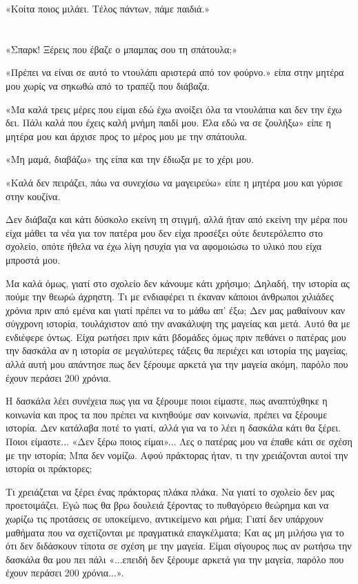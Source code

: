 \documentclass[12pt,twoside, openany]{book}
\begin{document}
«Κοίτα ποιος μιλάει. Τέλος πάντων, πάμε παιδιά.»

\chapter{}

«Σπαρκ! Ξέρεις που έβαζε ο μπαμπας σου τη σπάτουλα;»

«Πρέπει να είναι σε αυτό το ντουλάπι αριστερά από τον φούρνο.» είπα στην μητέρα μου χωρίς να σηκωθώ από το τραπέζι που διάβαζα.

«Μα καλά τρεις μέρες που είμαι εδώ έχω ανοίξει όλα τα ντουλάπια και δεν την έχω δει. Πάλι καλά που έχεις καλή μνήμη παιδί μου. Έλα εδώ να σε ζουλήξω» είπε η μητέρα μου και άρχισε προς το μέρος μου με την σπάτουλα.

«Μη μαμά, διαβάζω» της είπα και την έδιωξα με το χέρι μου.

«Καλά δεν πειράζει, πάω να συνεχίσω να μαγειρεύω» είπε η μητέρα μου και γύρισε στην κουζίνα.

Δεν διάβαζα και κάτι δύσκολο εκείνη τη στιγμή, αλλά ήταν από εκείνη την μέρα που είχα μάθει τα νέα για τον πατέρα μου δεν είχα προσέξει ούτε δευτερόλεπτο στο σχολείο, οπότε ήθελα να έχω λίγη ησυχία για να αφομοιώσω το υλικό που είχα μπροστά μου.

Μα καλά όμως, γιατί στο σχολείο δεν κάνουμε κάτι χρήσιμο; Δηλαδή, την ιστορία ας πούμε την θεωρώ άχρηστη. Τι με ενδιαφέρει τι έκαναν κάποιοι άνθρωποι χιλιάδες χρόνια πριν από εμένα και γιατί πρέπει να το μάθω απ’ έξω; Δεν μας μαθαίνουν καν σύγχρονη ιστορία, τουλάχιστον από την ανακάλυψη της μαγείας και μετά. Αυτό θα με ενδιέφερε όντως. Είχα ρωτήσει πριν κάτι βδομάδες όμως πριν πεθάνει ο πατέρας μου την δασκάλα αν η ιστορία σε μεγαλύτερες τάξεις θα περιέχει και ιστορία της μαγείας, αλλά αυτή μου απάντησε πως δεν ξέρουμε αρκετά για την μαγεία ακόμη, παρόλο που έχουν περάσει 200 χρόνια.

Η δασκάλα λέει συνέχεια πως για να ξέρουμε ποιοι είμαστε, πως αναπτύχθηκε η κοινωνία και προς τα που πρέπει να κινηθούμε σαν κοινωνία, πρέπει να ξέρουμε ιστορία. Δεν κατάλαβα ποτέ το γιατί, αλλά για να το λέει η δασκάλα κάτι θα ξέρει. Ποιοι είμαστε... «Δεν ξέρω ποιος είμαι»... Λες ο πατέρας μου να έπαθε κάτι σε σχέση με την ιστορία; Μπα δεν νομίζω. Αφού πράκτορας ήταν, τι την χρειάζονται αυτοί την ιστορία οι πράκτορες;

Τι χρειάζεται να ξέρει ένας πράκτορας πλάκα πλάκα. Να γιατί το σχολείο δεν μας προετοιμάζει. Εγώ πως θα βρω δουλειά ξέροντας το πυθαγόρειο θεώρημα και να χωρίζω τις προτάσεις σε υποκείμενο, αντικείμενο και ρήμα; Γιατί δεν υπάρχουν μαθήματα που να σχετίζονται με πραγματικά επαγκέλματα; Και ας μη μιλήσω για το ότι δεν διδάσκουν τίποτα σε σχέση με την μαγεία. Είμαι σίγουρος πως αν ρωτήσω την δασκάλα θα μου πει πάλι «...επειδή δεν ξέρουμε αρκετά για την μαγεία, παρόλο που έχουν περάσει 200 χρόνια...». 
\end{document}
